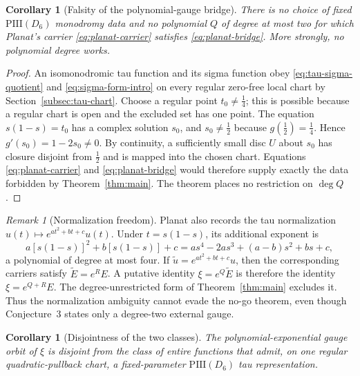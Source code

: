 \documentclass[11pt]{article}
\numberwithin{equation}{section}
\newtheorem{corollary}[theorem]{Corollary}
\theoremstyle{definition}
\theoremstyle{remark}
\newtheorem{remark}[theorem]{Remark}
\begin{document}
\begin{corollary}[Falsity of the polynomial-gauge bridge]
\label{cor:planat}
There is no choice of fixed $\mathrm{PIII}(D_6)$ monodromy data and no polynomial $Q$ of degree at
most two for which Planat's carrier \eqref{eq:planat-carrier} satisfies
\eqref{eq:planat-bridge}.  More strongly, no polynomial degree works.
\end{corollary}

\begin{proof}
An isomonodromic tau function and its sigma function obey \eqref{eq:tau-sigma-quotient} and
\eqref{eq:sigma-form-intro} on every regular zero-free local chart by
Section~\ref{subsec:tau-chart}.  Choose a regular point $t_0\neq\tfrac14$; this is possible because
a regular chart is open and the excluded set has one point.  The equation $s(1-s)=t_0$ has a
complex solution $s_0$, and $s_0\neq\tfrac12$ because $g(\tfrac12)=\tfrac14$.  Hence
$g'(s_0)=1-2s_0\neq0$.  By continuity, a sufficiently small disc $U$ about $s_0$ has closure
disjoint from $\tfrac12$ and is mapped into the chosen chart.  Equations
\eqref{eq:planat-carrier} and
\eqref{eq:planat-bridge} would therefore supply exactly the data forbidden by
Theorem~\ref{thm:main}.  The theorem places no restriction on $\deg Q$.
\end{proof}

\begin{remark}[Normalization freedom]
Planat also records the tau normalization
$u(t)\mapsto e^{at^2+bt+c}u(t)$.  Under $t=s(1-s)$, its additional exponent is
\begin{equation}
 a[s(1-s)]^2+b[s(1-s)]+c
 =as^4-2as^3+(a-b)s^2+bs+c,
 \label{eq:normalization-polynomial}
\end{equation}
a polynomial of degree at most four.  If $\widetilde u=e^{at^2+bt+c}u$, then the corresponding
carriers satisfy $\widetilde E=e^R E$.  A putative identity
$\xi=e^Q\widetilde E$ is therefore the identity $\xi=e^{Q+R}E$.  The
degree-unrestricted form of Theorem~\ref{thm:main} excludes it.  Thus the normalization ambiguity
cannot evade the no-go theorem, even though Conjecture~3 states only a degree-two external gauge.
\end{remark}

\begin{corollary}[Disjointness of the two classes]
\label{cor:disjointness}
The polynomial-exponential gauge orbit of $\xi$ is disjoint from the class of entire functions
that admit, on one regular quadratic-pullback chart, a fixed-parameter
$\mathrm{PIII}(D_6)$ tau representation.
\end{corollary}
\end{document}

